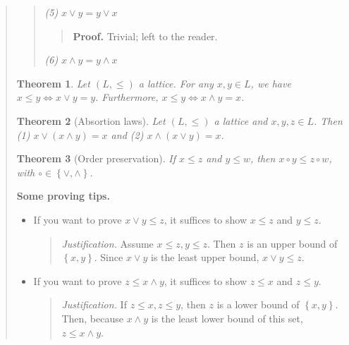 \documentclass[a4paper, 12pt]{article}
\newtheorem{theorem}{Theorem}
\newtheorem{theorem}{Theorem}
\begin{document}
\begin{quote}
\begin{quote}
    \textit{(5)} $x \lor y = y \lor  x$
    
    \begin{quote}
        \textbf{Proof.} Trivial; left to the reader.
    \end{quote}

    \textit{(6)} $x \land  y = y \land  x$


\end{quote}



\begin{theorem}
    Let $(L, \leq)$ a lattice. For any $x, y \in L$, we have $x \leq y \iff x
    \lor y = y$. Furthermore, $x \leq y \iff x \land y = x$.
\end{theorem}

\begin{theorem}[Absortion laws]
    Let $(L, \leq)$ a lattice and $x, y, z \in L$. Then \textit{(1)} $x \lor (x
    \land y) = x$ and \textit{(2)} $x \land (x \lor y) = x$.
\end{theorem}

\begin{theorem}[Order preservation]
    If $x \leq z$ and $y \leq w$, then $x \circ y \leq z \circ w$, with $\circ
    \in \left\{ \lor, \land \right\} $.
\end{theorem}

\textbf{Some proving tips.}

\begin{itemize}
    \item If you want to prove $x \lor  y \leq z$, it suffices to show $x \leq
        z$ and $y \leq z$. 

        \begin{quote}
            \textit{Justification.} Assume $x \leq z, y \leq z$. Then $z$ is an
            upper bound of $\left\{ x, y \right\} $. Since $x \lor  y$ is the
            least upper bound, $x \lor y \leq z$.
        \end{quote}

    \item If you want to prove $z \leq x \land  y$, it suffices to show $z \leq
        x$ and $z \leq y$. 

        \begin{quote}
            \textit{Justification.} If $z \leq x, z \leq y$, then $z$ is a lower
            bound of $\left\{ x, y \right\} $. Then, because $x \land  y$ is the
            least lower bound of this set, $z \leq x \land  y$.
        \end{quote}
\end{itemize} 


\end{quote}
\end{document}
